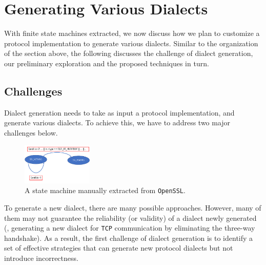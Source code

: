 

\section{Generating Various Dialects}
\label{sec:dialect}

With finite state machines extracted, we now discuss how we plan to customize a
protocol implementation to generate various dialects. Similar to the
organization of the section above, the following discusses the challenge of
dialect generation, our preliminary exploration and the proposed techniques in
turn.


\subsection{Challenges}
\label{sec:task2:challenges}

Dialect generation needs to take as input a protocol implementation, and
generate various dialects. To achieve this, we have to address two major
challenges below.

\begin{figure}
  \centering
  \includegraphics[width=0.3\textwidth]{figure/constraint_tighten}
  \caption{A state machine manually extracted from \texttt{OpenSSL}.}
  \label{fig:tighten}
\end{figure}

  To generate a new dialect, there are many
possible approaches. However, many of them may not guarantee the reliability (or
validity) of a dialect newly generated (\eg, generating a new dialect for
\texttt{TCP} communication by eliminating the three-way handshake). As a result,
the first challenge of dialect generation is to identify a set of effective
strategies that can generate new protocol dialects but not introduce
incorrectness.

